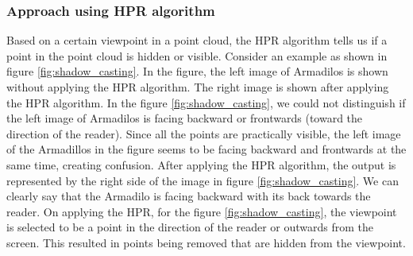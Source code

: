 \subsubsection{Approach using HPR algorithm}
Based on a certain viewpoint in a point cloud, the HPR algorithm tells us if a point in the point cloud is hidden or visible. Consider an example as shown in figure \ref{fig:shadow_casting}. In the figure, the left image of Armadilos is shown without applying the HPR algorithm. The right image is shown after applying the HPR algorithm. In the figure \ref{fig:shadow_casting}, we could not distinguish if the left image of Armadilos is facing backward or frontwards (toward the direction of the reader). Since all the points are practically visible, the left image of the Armadillos in the figure seems to be facing backward and frontwards at the same time, creating confusion. After applying the HPR algorithm, the output is represented by the right side of the image in figure \ref{fig:shadow_casting}. We can clearly say that the Armadilo is facing backward with its back towards the reader. On applying the HPR, for the figure \ref{fig:shadow_casting}, the viewpoint is selected to be a point in the direction of the reader or outwards from the screen. This resulted in points being removed that are hidden from the viewpoint.

